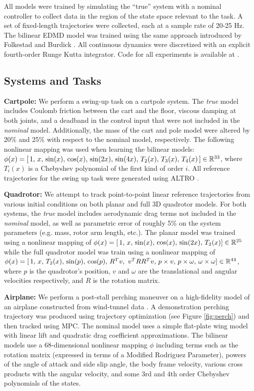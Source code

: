 \documentclass{article}
\begin{document}
All models were trained by simulating the ``true'' system with a nominal controller to 
collect data in the region of the state space relevant to the task. A set of fixed-length 
trajectories were collected, each at a sample rate of 20-25 Hz. The bilinear EDMD model was
trained using the same approach introduced by Folkestad and Burdick \cite{Folkestad2021}.
All continuous dynamics were discretized with an explicit fourth-order Runge Kutta
integrator. Code for all experiments is available at .  

\subsection{Systems and Tasks}

\textbf{Cartpole:} We perform a swing-up task on a cartpole system. The \textit{true} model
includes Coulomb friction between the cart and the floor, viscous damping at both joints,
and a deadband in the control input that were not included in the \textit{nominal} model.
Additionally, the mass of the cart and pole model were altered by 20\% and 25\% with respect
to the nominal model, respectively.  The following nonlinear mapping was used when learning
the bilinear models: 
$\phi(x) = [\, 1,\,
x,\, \sin(x),\, \cos(x),\, \sin(2x),\, \sin(4x),\, T_2(x),\, T_3(x),\, T_4(x)\, ] \in
\mathbb{R}^{33}$, where $T_i(x)$ is a Chebyshev polynomial of the first kind of order $i$. 
All reference trajectories for the swing up task were generated using ALTRO 
\cite{Howell2019,Jackson2021}.

\textbf{Quadrotor:} We attempt to track point-to-point linear reference trajectories from
various initial conditions on both planar and full 3D quadrotor models. For both systems,
the \textit{true} model includes aerodynamic drag terms not included in the \textit{nominal}
model, as well as parametric error of roughly 5\% on the system parameters (e.g. mass, rotor
arm length, etc.). The planar model was trained using a nonlinear mapping of $\phi(x) = [\,
1,\, x,\, \sin(x),\, \cos(x),\, \sin(2x),\, T_2(x) ] \in \mathbb{R}^{25}$ while the full quadrotor
model was train using a nonlinear mapping of $\phi(x) = [\, 1,\, x,\, T_2(x),\, \sin(p),\,
\cos(p),\, R^{T}v,\ v^{T}RR^{T}v,\, p \times v,\, p \times \omega,\, \omega \times \omega ]
\in \mathbb{R}^{44}$, where $p$ is the quadrotor's position, $v$ and $\omega$ are the translational
and angular velocities respectively, and $R$ is the rotation matrix.

\textbf{Airplane:} We perform a post-stall perching maneuver on a high-fidelity model of an
airplane constructed from wind-tunnel data \cite{Manchester2017}. A demonstration perching
trajectory was produced using trajectory optimization (see Figure \ref{fig:perch}) and then
tracked using MPC. The nominal model uses a simple flat-plate wing model with linear lift
and quadratic drag coefficient approximations. The bilinear models use a 68-dimensional
nonlinear mapping $\phi$ including terms such as the rotation matrix (expressed in terms of
a Modified Rodriguez Parameter), powers of the angle of attack and side slip angle, the body
frame velocity, various cross products with the angular velocity, and some 3rd and 4th order
Chebyshev polynomials of the states.
\end{document}
